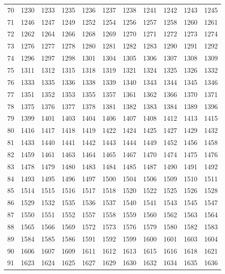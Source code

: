 \begin{longtable}{|r|rrrrrrrrrr|}
  70 & 1230 & 1233 & 1235 & 1236 & 1237 & 1238 & 1241 & 1242 & 1243 & 1245 \\ 
  71 & 1246 & 1247 & 1249 & 1252 & 1254 & 1256 & 1257 & 1258 & 1260 & 1261 \\ 
  72 & 1262 & 1264 & 1266 & 1268 & 1269 & 1270 & 1271 & 1272 & 1273 & 1274 \\ 
  73 & 1276 & 1277 & 1278 & 1280 & 1281 & 1282 & 1283 & 1290 & 1291 & 1292 \\ 
  74 & 1296 & 1297 & 1298 & 1301 & 1304 & 1305 & 1306 & 1307 & 1308 & 1309 \\ 
  75 & 1311 & 1312 & 1315 & 1318 & 1319 & 1321 & 1324 & 1325 & 1326 & 1332 \\ 
  76 & 1333 & 1335 & 1336 & 1338 & 1339 & 1340 & 1343 & 1344 & 1345 & 1346 \\ 
  77 & 1351 & 1352 & 1353 & 1355 & 1357 & 1361 & 1362 & 1366 & 1370 & 1371 \\ 
  78 & 1375 & 1376 & 1377 & 1378 & 1381 & 1382 & 1383 & 1384 & 1389 & 1396 \\ 
  79 & 1399 & 1401 & 1403 & 1404 & 1406 & 1407 & 1408 & 1412 & 1413 & 1415 \\ 
  80 & 1416 & 1417 & 1418 & 1419 & 1422 & 1424 & 1425 & 1427 & 1429 & 1432 \\ 
  81 & 1433 & 1440 & 1441 & 1442 & 1443 & 1444 & 1449 & 1452 & 1456 & 1458 \\ 
  82 & 1459 & 1461 & 1463 & 1464 & 1465 & 1467 & 1470 & 1474 & 1475 & 1476 \\ 
  83 & 1478 & 1479 & 1480 & 1483 & 1484 & 1485 & 1487 & 1490 & 1491 & 1492 \\ 
  84 & 1493 & 1495 & 1496 & 1497 & 1500 & 1504 & 1506 & 1509 & 1510 & 1511 \\ 
  85 & 1514 & 1515 & 1516 & 1517 & 1518 & 1520 & 1522 & 1525 & 1526 & 1528 \\ 
  86 & 1529 & 1532 & 1535 & 1536 & 1537 & 1540 & 1541 & 1543 & 1545 & 1547 \\ 
  87 & 1550 & 1551 & 1552 & 1557 & 1558 & 1559 & 1560 & 1562 & 1563 & 1564 \\ 
  88 & 1565 & 1566 & 1569 & 1572 & 1573 & 1576 & 1579 & 1580 & 1582 & 1583 \\ 
  89 & 1584 & 1585 & 1586 & 1591 & 1592 & 1599 & 1600 & 1601 & 1603 & 1604 \\ 
  90 & 1606 & 1607 & 1609 & 1611 & 1612 & 1613 & 1615 & 1616 & 1618 & 1621 \\ 
  91 & 1623 & 1624 & 1625 & 1627 & 1629 & 1630 & 1632 & 1634 & 1635 & 1636 \\ 

\end{longtable}
